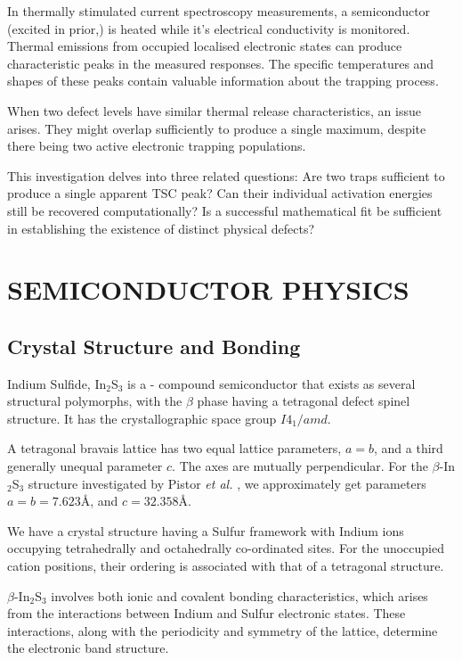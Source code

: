 \documentclass[letterpaper, 10pt, conference]{ieeeconf}
\newcommand{\RNum}[1]{\uppercase\expandafter{\romannumeral #1\relax}}
\begin{document}
In thermally stimulated current spectroscopy measurements, a semiconductor (excited in prior,) is heated while it's electrical conductivity is monitored. Thermal emissions from occupied localised electronic states can produce characteristic peaks in the measured responses. The specific temperatures and shapes of these peaks contain valuable information about the trapping process.

When two defect levels have similar thermal release characteristics, an issue arises. They might overlap sufficiently to produce a single maximum, despite there being two active electronic trapping populations.

This investigation delves into three related questions: Are two traps sufficient to produce a single apparent TSC peak? Can their individual activation energies still be recovered computationally? Is a successful mathematical fit be sufficient in establishing the existence of distinct physical defects?

\section{SEMICONDUCTOR PHYSICS}
\subsection{Crystal Structure and Bonding}

Indium Sulfide, In$_2$S$_3$ is a \RNum{3}-\RNum{6} compound semiconductor that exists as several structural polymorphs, with the $\beta$ phase having a tetragonal defect spinel structure. It has the crystallographic space group $I4_1/amd$. \cite{pistor}

A tetragonal bravais lattice has two equal lattice parameters, $a=b$, and a third generally unequal parameter $c$. The axes are mutually perpendicular. For the $\beta$-In$_2$S$_3$ structure investigated by {Pistor \emph{et al.}} \cite{pistor}, we approximately get parameters $a = b = 7.623 \text{\AA}$, and $c = 32.358 \text{\AA}$.

We have a crystal structure having a Sulfur framework with Indium ions occupying tetrahedrally and octahedrally co-ordinated sites. For the unoccupied cation positions, their ordering is associated with that of a tetragonal structure.

$\beta$-In$_2$S$_3$ involves both ionic and covalent bonding characteristics, which arises from the interactions between Indium and Sulfur electronic states. These interactions, along with the periodicity and symmetry of the lattice, determine the electronic band structure.
\end{document}
